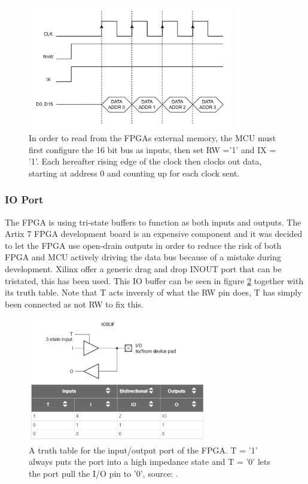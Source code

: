 \begin{figure}[H]
    \centering
    \includegraphics[clip, trim=0 0 0 0, width=0.8\textwidth]{Sections/7_SystemDesign/Figures/MCU_IX_FETCH.pdf}
    \caption{In order to read from the FPGAs external memory, the MCU must first configure the 16 bit bus as inputs, then set RW ='1' and IX = '1'. Each hereafter rising edge of the clock then clocks out data, starting at address 0 and counting up for each clock sent.}
    \label{fig_7_2_1_CommRead_IX}
\end{figure}

\subsubsection{IO Port}
The FPGA is using tri-state buffers to function as both inputs and outputs. The Artix 7 FPGA development board is an expensive component and it was decided to let the FPGA use open-drain outputs in order to reduce the risk of both FPGA and MCU actively driving the data bus because of a mistake during development. Xilinx offer a generic drag and drop INOUT port that can be tristated, this has been used. This IO buffer can be seen in figure \ref{fig_7_2_1_IOBUF} together with its truth table. Note that T acts inversly of what the RW pin does, T has simply been connected as not RW to fix this.

\begin{figure}[H]
    \centering
    \includegraphics[clip, trim=0 0 0 0, width=0.7\textwidth]{Sections/7_SystemDesign/Figures/IOBUF.pdf}
    \caption{A truth table for the input/output port of the FPGA. T = '1' always puts the port into a high impedance state and T = '0' lets the port pull the I/O pin to '0', source: \cite{Xilinx_IOBUF}.}
    \label{fig_7_2_1_IOBUF}
\end{figure}

